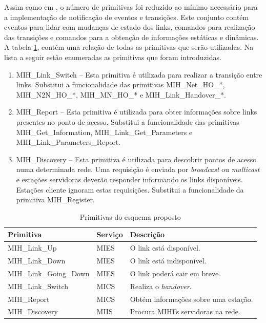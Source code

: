 \documentclass[12pt]{article}
\begin{document}
Assim como em \cite{tawil:2008}, o número de primitivas foi reduzido ao mínimo 
necessário para a implementação de notificação de eventos e transições.
Este conjunto contém eventos para lidar com mudanças de estado dos links, 
comandos para realização das transições e comandos para a obtenção de 
informações estáticas e dinâmicas. A tabela \ref{tab:primitivas}, contém uma 
relação de todas as primitivas que serão utilizadas. Na lista a seguir estão 
enumeradas as primitivas que foram introduzidas.  

\begin{enumerate}

	\item MIH\_Link\_Switch -- Esta primitiva é utilizada para realizar a 
		transição entre links. Substitui a funcionalidade das primitivas 
		MIH\_Net\_HO\_*, MIH\_N2N\_HO\_*, MIH\_MN\_HO\_* e 
		MIH\_Link\_Handover\_*.
	
	\item MIH\_Report -- Esta primitiva é utilizada para obter informações 
		sobre links presentes no ponto de acesso. Substitui a funcionalidade 
		das primitivas MIH\_Get\_Information, MIH\_Link\_Get\_Parameters e 
		MIH\_Link\_Parameters\_Report.
	
	\item MIH\_Discovery -- Esta primitiva é utilizada para descobrir
		pontos de acesso numa determinada rede. Uma requisição é enviada por 
		\textit{broadcast} ou \textit{multicast} e estações servidoras deverão 
		responder informando os links disponíveis. Estações cliente ignoram 
		estas requisições. Substitui a funcionalidade da primitiva
		MIH\_Register.

\end{enumerate}

\begin{table}
	\centering
	\caption{Primitivas do esquema proposto}
	\label{tab:primitivas}
	\begin{tabular}[ht]{ l | l | l }
		Primitiva & Serviço & Descrição \\
		\hline
		MIH\_Link\_Up          & MIES & O link está disponível. \\
		MIH\_Link\_Down        & MIES & O link está indisponível. \\
		MIH\_Link\_Going\_Down & MIES & O link poderá cair em breve. \\
		MIH\_Link\_Switch      & MICS & Realiza o \textit{handover}. \\
		MIH\_Report           & MICS & Obtém informações sobre uma estação. \\
		MIH\_Discovery   & MIIS & Procura MIHFs servidoras na rede.  \\
		\hline
	\end{tabular}
	
\end{table}
\end{document}
